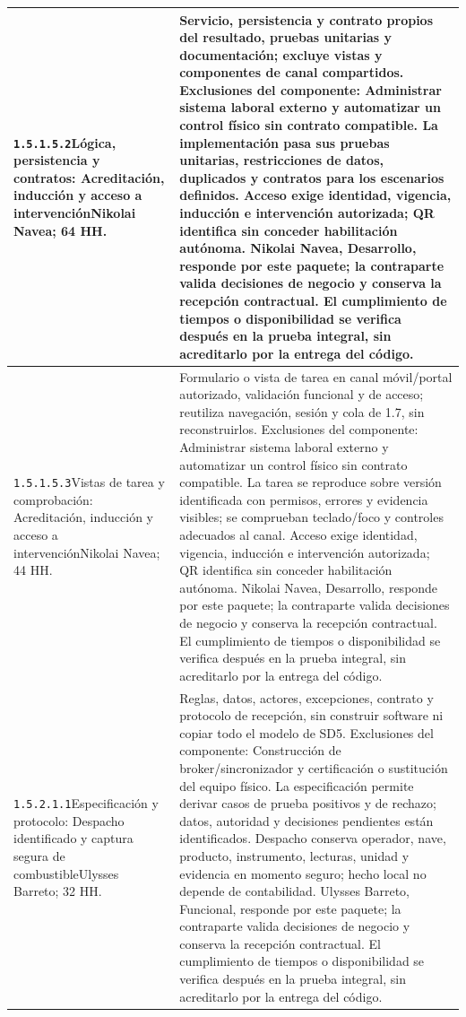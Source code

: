 \begin{longtable}{L{52mm}L{91mm}}
\texttt{1.\allowbreak{}5.\allowbreak{}1.\allowbreak{}5.\allowbreak{}2}\newline Lógica, persistencia y contratos: Acreditación, inducción y acceso a intervención\newline Nikolai Navea; 64 HH. & Servicio, persistencia y contrato propios del resultado, pruebas unitarias y documentación; excluye vistas y componentes de canal compartidos. Exclusiones del componente: Administrar sistema laboral externo y automatizar un control físico sin contrato compatible. La implementación pasa sus pruebas unitarias, restricciones de datos, duplicados y contratos para los escenarios definidos. Acceso exige identidad, vigencia, inducción e intervención autorizada; QR identifica sin conceder habilitación autónoma. Nikolai Navea, Desarrollo, responde por este paquete; la contraparte valida decisiones de negocio y conserva la recepción contractual. El cumplimiento de tiempos o disponibilidad se verifica después en la prueba integral, sin acreditarlo por la entrega del código.\\\hline
\texttt{1.\allowbreak{}5.\allowbreak{}1.\allowbreak{}5.\allowbreak{}3}\newline Vistas de tarea y comprobación: Acreditación, inducción y acceso a intervención\newline Nikolai Navea; 44 HH. & Formulario o vista de tarea en canal móvil/portal autorizado, validación funcional y de acceso; reutiliza navegación, sesión y cola de 1.7, sin reconstruirlos. Exclusiones del componente: Administrar sistema laboral externo y automatizar un control físico sin contrato compatible. La tarea se reproduce sobre versión identificada con permisos, errores y evidencia visibles; se comprueban teclado/foco y controles adecuados al canal. Acceso exige identidad, vigencia, inducción e intervención autorizada; QR identifica sin conceder habilitación autónoma. Nikolai Navea, Desarrollo, responde por este paquete; la contraparte valida decisiones de negocio y conserva la recepción contractual. El cumplimiento de tiempos o disponibilidad se verifica después en la prueba integral, sin acreditarlo por la entrega del código.\\\hline
\texttt{1.\allowbreak{}5.\allowbreak{}2.\allowbreak{}1.\allowbreak{}1}\newline Especificación y protocolo: Despacho identificado y captura segura de combustible\newline Ulysses Barreto; 32 HH. & Reglas, datos, actores, excepciones, contrato y protocolo de recepción, sin construir software ni copiar todo el modelo de SD5. Exclusiones del componente: Construcción de broker/sincronizador y certificación o sustitución del equipo físico. La especificación permite derivar casos de prueba positivos y de rechazo; datos, autoridad y decisiones pendientes están identificados. Despacho conserva operador, nave, producto, instrumento, lecturas, unidad y evidencia en momento seguro; hecho local no depende de contabilidad. Ulysses Barreto, Funcional, responde por este paquete; la contraparte valida decisiones de negocio y conserva la recepción contractual. El cumplimiento de tiempos o disponibilidad se verifica después en la prueba integral, sin acreditarlo por la entrega del código.\\\hline

\end{longtable}
